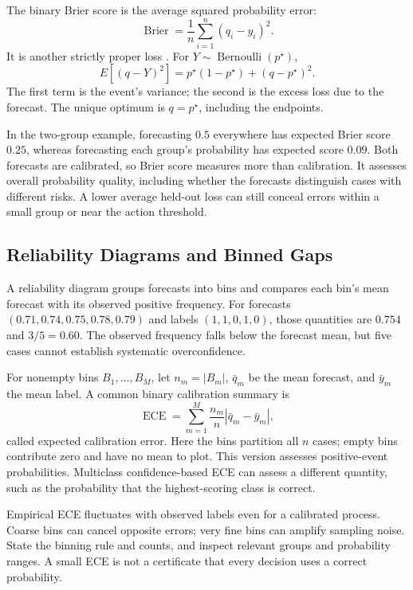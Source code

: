 The binary Brier score is the average squared probability error:
\[
\operatorname{Brier}=\frac1n\sum_{i=1}^n(q_i-y_i)^2.
\]
It is another strictly proper loss \citep{gneiting2007}. For $Y\sim\operatorname{Bernoulli}(p^\star)$,
\[
E[(q-Y)^2]=p^\star(1-p^\star)+(q-p^\star)^2.
\]
The first term is the event's variance; the second is the excess loss due to the forecast. The unique optimum is $q=p^\star$, including the endpoints.

In the two-group example, forecasting $0.5$ everywhere has expected Brier score $0.25$, whereas forecasting each group's probability has expected score $0.09$. Both forecasts are calibrated, so Brier score measures more than calibration. It assesses overall probability quality, including whether the forecasts distinguish cases with different risks. A lower average held-out loss can still conceal errors within a small group or near the action threshold.

\subsection{Reliability Diagrams and Binned Gaps}

A reliability diagram groups forecasts into bins and compares each bin's mean forecast with its observed positive frequency. For forecasts $(0.71,0.74,0.75,0.78,0.79)$ and labels $(1,1,0,1,0)$, those quantities are $0.754$ and $3/5=0.60$. The observed frequency falls below the forecast mean, but five cases cannot establish systematic overconfidence.

For nonempty bins $B_1,\ldots,B_M$, let $n_m=|B_m|$, $\bar q_m$ be the mean forecast, and $\bar y_m$ the mean label. A common binary calibration summary is
\[
\operatorname{ECE}=\sum_{m=1}^M\frac{n_m}{n}
\left|\bar q_m-\bar y_m\right|,
\]
called expected calibration error. Here the bins partition all $n$ cases; empty bins contribute zero and have no mean to plot. This version assesses positive-event probabilities. Multiclass confidence-based ECE can assess a different quantity, such as the probability that the highest-scoring class is correct.

Empirical ECE fluctuates with observed labels even for a calibrated process. Coarse bins can cancel opposite errors; very fine bins can amplify sampling noise. State the binning rule and counts, and inspect relevant groups and probability ranges. A small ECE is not a certificate that every decision uses a correct probability.

